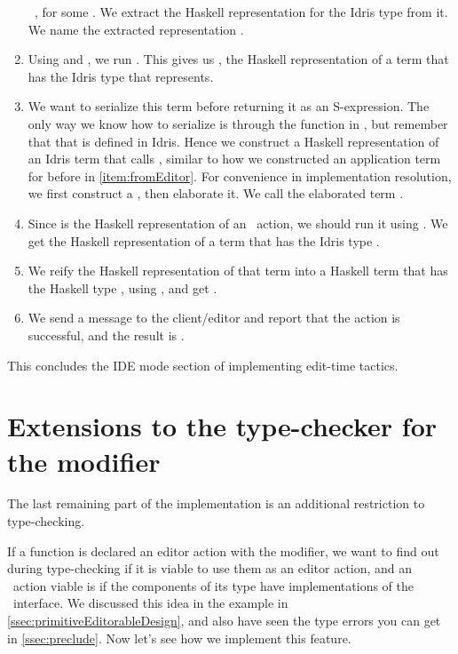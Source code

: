 \begin{enumerate}
    \texttt{ }, for some . We extract the Haskell
    representation for the Idris type  from it.  We name the extracted
    representation .
  \item Using  and , we run . This
    gives us , the Haskell representation of a term that has the Idris
    type that  represents.
  \item We want to serialize this term before returning it as an S-expression.
    The only way we know how to serialize is through the  function
    in , but remember that that is defined in Idris.
    Hence we construct a Haskell representation of an Idris term that calls
    , similar to how we constructed an application term for
     before in \autoref{item:fromEditor}.
    For convenience in implementation resolution, we first construct a
    , then elaborate it. We call the elaborated term .
  \item Since  is the Haskell representation of an \Elab\ action, we
    should run it using . We get the Haskell
    representation of a term that has the Idris type .
  \item We reify the Haskell representation of that term into a Haskell term
    that has the Haskell type , using , and get
    .
  \item We send a message to the client/editor and report that the action is
    successful, and the result is .
\end{enumerate}

This concludes the IDE mode section of implementing edit-time tactics.

\section{Extensions to the type-checker for the  modifier}\label{sec:extCheck}

The last remaining part of the implementation is an additional restriction to
type-checking.

If a function is declared an editor action with the  modifier, we
want to find out during type-checking if it is viable to use them as an editor
action, and an \Elab\ action viable is if the components of its type have
implementations of the \Editorable\ interface. We discussed this idea in the
 example in \autoref{ssec:primitiveEditorableDesign}, and also have
seen the type errors you can get in \autoref{ssec:preclude}. Now let's see how
we implement this feature.

